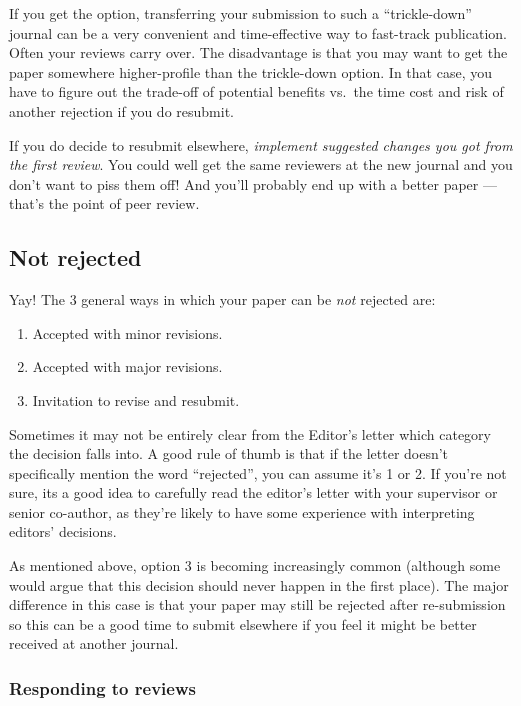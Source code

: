 \documentclass[11pt,]{article}
\begin{document}
If you get the option, transferring your submission to such a
``trickle-down'' journal can be a very convenient and time-effective way
to fast-track publication. Often your reviews carry over. The
disadvantage is that you may want to get the paper somewhere
higher-profile than the trickle-down option. In that case, you have to
figure out the trade-off of potential benefits vs.~the time cost and
risk of another rejection if you do resubmit.

If you do decide to resubmit elsewhere, \emph{implement suggested
changes you got from the first review}. You could well get the same
reviewers at the new journal and you don't want to piss them off! And
you'll probably end up with a better paper --- that's the point of peer
review.

\subsection{Not rejected}\label{not-rejected}

Yay! The 3 general ways in which your paper can be \emph{not} rejected
are:

\begin{enumerate}
\def\labelenumi{\arabic{enumi}.}
\itemsep1pt\parskip0pt
\item
  Accepted with minor revisions.
\item
  Accepted with major revisions.
\item
  Invitation to revise and resubmit.
\end{enumerate}

Sometimes it may not be entirely clear from the Editor's letter which
category the decision falls into. A good rule of thumb is that if the
letter doesn't specifically mention the word ``rejected'', you can
assume it's 1 or 2. If you're not sure, its a good idea to carefully
read the editor's letter with your supervisor or senior co-author, as
they're likely to have some experience with interpreting editors'
decisions.

As mentioned above, option 3 is becoming increasingly common (although
some would argue that this decision should never happen in the first
place). The major difference in this case is that your paper may still
be rejected after re-submission so this can be a good time to submit
elsewhere if you feel it might be better received at another journal.

\subsubsection{Responding to reviews}\label{responding-to-reviews}
\end{document}
